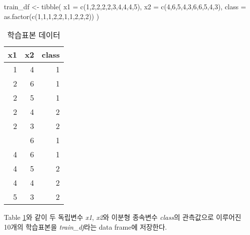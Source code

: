 \documentclass[
]{book}
\newenvironment{Shaded}{\begin{snugshade}}{\end{snugshade}}
\newcommand{\AttributeTok}[1]{\textcolor[rgb]{0.77,0.63,0.00}{#1}}
\newcommand{\DecValTok}[1]{\textcolor[rgb]{0.00,0.00,0.81}{#1}}
\newcommand{\FunctionTok}[1]{\textcolor[rgb]{0.00,0.00,0.00}{#1}}
\newcommand{\NormalTok}[1]{#1}
\newcommand{\OtherTok}[1]{\textcolor[rgb]{0.56,0.35,0.01}{#1}}
\begin{document}
\begin{Shaded}
\begin{Highlighting}[]
\NormalTok{train\_df }\OtherTok{\textless{}{-}} \FunctionTok{tibble}\NormalTok{(}
  \AttributeTok{x1 =} \FunctionTok{c}\NormalTok{(}\DecValTok{1}\NormalTok{,}\DecValTok{2}\NormalTok{,}\DecValTok{2}\NormalTok{,}\DecValTok{2}\NormalTok{,}\DecValTok{2}\NormalTok{,}\DecValTok{3}\NormalTok{,}\DecValTok{4}\NormalTok{,}\DecValTok{4}\NormalTok{,}\DecValTok{4}\NormalTok{,}\DecValTok{5}\NormalTok{),}
  \AttributeTok{x2 =} \FunctionTok{c}\NormalTok{(}\DecValTok{4}\NormalTok{,}\DecValTok{6}\NormalTok{,}\DecValTok{5}\NormalTok{,}\DecValTok{4}\NormalTok{,}\DecValTok{3}\NormalTok{,}\DecValTok{6}\NormalTok{,}\DecValTok{6}\NormalTok{,}\DecValTok{5}\NormalTok{,}\DecValTok{4}\NormalTok{,}\DecValTok{3}\NormalTok{),}
  \AttributeTok{class =} \FunctionTok{as.factor}\NormalTok{(}\FunctionTok{c}\NormalTok{(}\DecValTok{1}\NormalTok{,}\DecValTok{1}\NormalTok{,}\DecValTok{1}\NormalTok{,}\DecValTok{2}\NormalTok{,}\DecValTok{2}\NormalTok{,}\DecValTok{1}\NormalTok{,}\DecValTok{1}\NormalTok{,}\DecValTok{2}\NormalTok{,}\DecValTok{2}\NormalTok{,}\DecValTok{2}\NormalTok{))}
\NormalTok{)}
\end{Highlighting}
\end{Shaded}

\begin{table}

\caption{\label{tab:tree-train-data-table}학습표본 데이터}
\centering
\begin{tabular}[t]{rrr}
\toprule
x1 & x2 & class\\
\midrule
1 & 4 & 1\\
2 & 6 & 1\\
2 & 5 & 1\\
2 & 4 & 2\\
2 & 3 & 2\\
\addlinespace
3 & 6 & 1\\
4 & 6 & 1\\
4 & 5 & 2\\
4 & 4 & 2\\
5 & 3 & 2\\
\bottomrule
\end{tabular}
\end{table}

Table \ref{tab:tree-train-data-table}와 같이 두 독립변수 \emph{x1}, \emph{x2}와 이분형 종속변수 \emph{class}의 관측값으로 이루어진 10개의 학습표본을 \emph{train\_df}라는 data frame에 저장한다.
\end{document}
